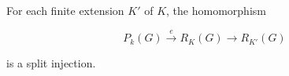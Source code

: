 For each finite extension $K'$ of $K$, the homomorphism

$$P_k(G) \xrightarrow{e} R_K(G) \to R_{K'}(G)$$

is a split injection.
